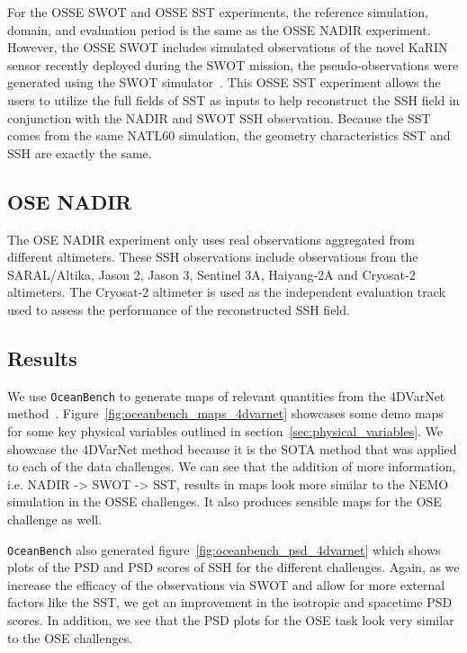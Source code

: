 For the OSSE SWOT and OSSE SST experiments, the reference simulation, domain, and evaluation period is the same as the OSSE NADIR experiment.
However, the OSSE SWOT includes simulated observations of the novel KaRIN sensor recently deployed during the SWOT mission, the pseudo-observations were generated using the SWOT simulator~\cite{SWOT}. 
This OSSE SST experiment allows the users to utilize the full fields of SST as inputs to help reconstruct the SSH field in conjunction with the NADIR and SWOT SSH observation.
Because the SST comes from the same NATL60 simulation, the geometry characteristics SST and SSH are exactly the same.

\subsection{OSE NADIR} \label{sec:ose_nadir}

The OSE NADIR experiment only uses real observations aggregated from different altimeters. These SSH observations include observations from the SARAL/Altika, Jason 2, Jason 3, Sentinel 3A, Haiyang-2A and Cryosat-2 altimeters. The Cryosat-2 altimeter is used as the independent evaluation track used to assess the performance of the reconstructed SSH field.

\subsection{Results}

We use \texttt{OceanBench} to generate maps of relevant quantities from the 4DVarNet method~\cite{4DVARNETSWOT,4DVARNETSST}.
Figure~\ref{fig:oceanbench_maps_4dvarnet} showcases some demo maps for some key physical variables outlined in section~\ref{sec:physical_variables}.
We showcase the 4DVarNet method because it is the SOTA method that was applied to each of the data challenges.
We can see that the addition of more information, i.e. NADIR -> SWOT -> SST, results in maps look more similar to the NEMO simulation in the OSSE challenges.
It also produces sensible maps for the OSE challenge as well.

\texttt{OceanBench} also generated figure~\ref{fig:oceanbench_psd_4dvarnet} which shows plots of the PSD and PSD scores of SSH for the different challenges.
Again, as we increase the efficacy of the observations via SWOT and allow for more external factors like the SST, we get an improvement in the isotropic and spacetime PSD scores.
In addition, we see that the PSD plots for the OSE task look very similar to the OSE challenges. 

